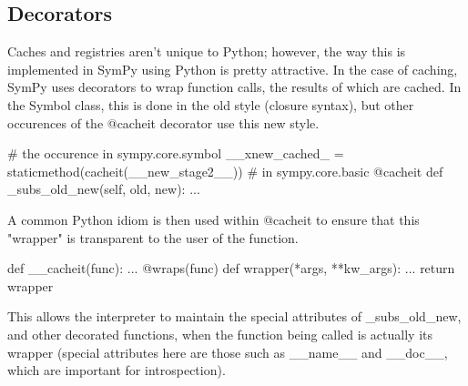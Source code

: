 \documentclass[11pt,a4paper,oneside]{report}
\begin{document}
\subsection*{\small Decorators}
Caches and registries aren't unique to Python; however, the way this is implemented in SymPy using Python is pretty attractive. In the case of caching, SymPy uses decorators to wrap function calls, the results of which are cached. In the Symbol class, this is done in the old style (closure syntax), but other occurences of the @cacheit decorator use this new style. 
\begin{verbatimtab}
# the occurence in sympy.core.symbol
__xnew_cached_ = staticmethod(cacheit(__new_stage2__))
# in sympy.core.basic
@cacheit
def _subs_old_new(self, old, new):
	...
\end{verbatimtab}
A common Python idiom is then used within @cacheit to ensure that this "wrapper" is transparent to the user of the function.
\begin{verbatimtab}
def __cacheit(func):
	...
	@wraps(func)
    def wrapper(*args, **kw_args):
    	...
    return wrapper
\end{verbatimtab}
This allows the interpreter to maintain the special attributes of \_subs\_old\_new, and other decorated functions, when the function being called is actually its wrapper (special attributes here are those such as \_\_name\_\_ and \_\_doc\_\_, which are important for introspection).
\end{document}
